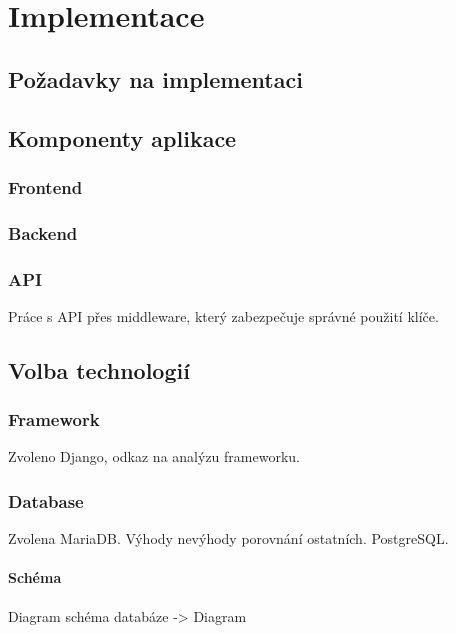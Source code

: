 \chapter{Implementace}
\label{ch:implementation}

\section{Požadavky na implementaci}
\label{sec:implementation-requirements}

\section{Komponenty aplikace}
\label{sec:implementation-components}

\subsection{Frontend}
\label{subsec:implementation-frontend}

\subsection{Backend}
\label{subsec:implementation-backend}

\subsection{API}
\label{subsec:implementation-api}
Práce s API přes middleware, který zabezpečuje správné použití klíče.

\section{Volba technologií}
\label{sec:implementation-technologies}

\subsection{Framework}
\label{subsec:implementation-technologies-framework}
Zvoleno Django, odkaz na analýzu frameworku.

\subsection{Database}
\label{subsec:implementation-technologies-database}
Zvolena MariaDB. Výhody nevýhody porovnání ostatních. PostgreSQL\@.

\subsubsection*{Schéma}
\label{subsubsec:implementation-technologies-database-scheme}
Diagram schéma databáze -> Diagram

